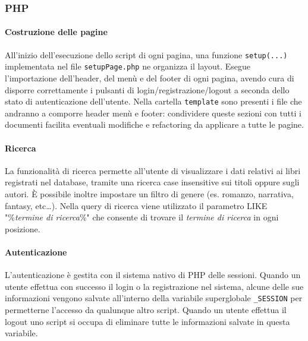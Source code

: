 \documentclass[12pt,a4paper,headings=optiontohead]{article}
\begin{document}
	\subsubsection{PHP}
	\paragraph{Costruzione delle pagine} 
	
	All'inizio dell'esecuzione dello script di ogni pagina, una funzione \texttt{setup(...)} implementata nel file \texttt{setupPage.php} ne organizza il layout. Esegue l'importazione dell'header, del menù e del footer di ogni pagina, avendo cura di disporre correttamente i pulsanti di login/registrazione/logout a seconda dello stato di autenticazione dell'utente. Nella cartella \texttt{template} sono presenti i file che andranno a comporre header menù e footer: condividere queste sezioni con tutti i documenti facilita eventuali modifiche e refactoring da applicare a tutte le pagine.
	
	\paragraph{Ricerca}
	La funzionalità di ricerca permette all'utente di visualizzare i dati relativi ai libri registrati nel database, tramite una ricerca case insensitive sui titoli oppure sugli autori. È possibile inoltre impostare un filtro di genere (es. romanzo, narrativa, fantasy, etc\dots). Nella query di ricerca viene utilizzato il parametro LIKE "\%\textit{termine di ricerca}\%" che consente di trovare il \textit{termine di ricerca} in ogni posizione.
	
	\paragraph{Autenticazione}
	L'autenticazione è gestita con il sistema nativo di PHP delle sessioni. Quando un utente effettua con successo il login o la registrazione nel sistema, alcune delle sue informazioni vengono salvate all'interno della variabile superglobale \texttt{\_SESSION} per permetterne l'accesso da qualunque altro script. Quando un utente effettua il logout uno script si occupa di eliminare tutte le informazioni salvate in questa variabile. 
	
\end{document}
